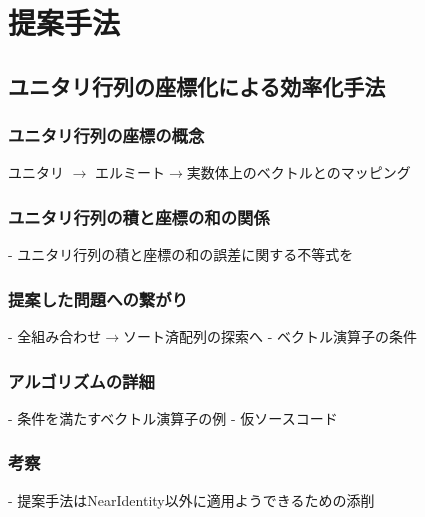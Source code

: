 \chapter{提案手法}\label{chap:proposal}
\section{ユニタリ行列の座標化による効率化手法}\label{sec:propsal1}
\subsection{ユニタリ行列の座標の概念}
ユニタリ $\rightarrow$ エルミート$\rightarrow$実数体上のベクトルとのマッピング
\subsection{ユニタリ行列の積と座標の和の関係}
- ユニタリ行列の積と座標の和の誤差に関する不等式を
\subsection{提案した問題への繋がり}
- 全組み合わせ$\rightarrow$ソート済配列の探索へ
- ベクトル演算子の条件
\subsection{アルゴリズムの詳細}
- 条件を満たすベクトル演算子の例
- 仮ソースコード
\subsection{考察}
- 提案手法はNearIdentity以外に適用ようできるための添削
